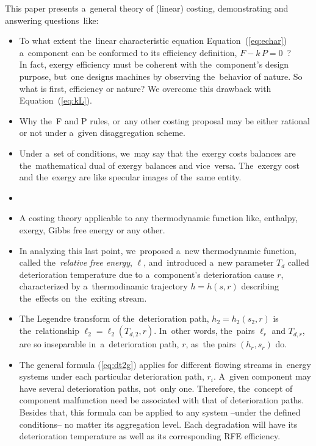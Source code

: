 \documentclass[energies,article,accept,moreauthors,pdftex]{Definitions/mdpi}
\begin{document}
This paper presents a~general theory of (linear) costing, demonstrating and answering questions~like:
\begin{itemize}[leftmargin=*,labelsep=5.5mm]
	\item To what extent the~linear characteristic equation Equation~(\ref{eq:echar}) a~component can be conformed to its efficiency definition, $F - k\, P = 0$~?\\
	In fact, exergy efficiency must be coherent with the~component's design purpose, but~one designs machines by observing the~behavior of nature. So what is first, efficiency or nature? We overcome this drawback with Equation~(\ref{eq:kL}).
	\item Why the~F and P rules, or~any other costing proposal may be either rational or not under a~given disaggregation scheme.
	\item Under a~set of conditions, we~may say that the~exergy costs balances are the~mathematical dual of exergy balances and vice~versa. The~exergy cost and the~exergy are like specular images of the~same entity.
	\item {}
	\item A costing theory applicable to any thermodynamic function like, enthalpy, exergy, Gibbs free energy or any other.
	\item In analyzing this last point, we~proposed a~new thermodynamic function, called the~\emph{relative free energy}, $\ell$, and~introduced a~new parameter $T_d$ called deterioration temperature due to a~component’s deterioration cause $r$, characterized by a~thermodinamic trajectory $h=h(s, r)$ describing the~effects on~the~exiting stream.
	\item The Legendre transform of the~deterioration path, $h_2=h_2 (s_2, r)$ is the~relationship
	$\ell_2 = \ell_2(T_{d,2} , r)$. In~other words, the~pairs  $\ell_r$ and $T_{d,r}$, are so inseparable in~a~deterioration path, $r$, as~the pairs $(h_r,s_r)$ do.
	\item The general formula (\ref{eq:dt2g}) applies for different flowing streams in~energy systems under each particular deterioration path, $r_i$. A~given component may have several deterioration paths, not~only one. Therefore, the~concept of component malfunction need be associated with that of deterioration paths. Besides that, this formula can be applied to any system --under the defined conditions--  no matter its aggregation level. Each degradation will have its deterioration temperature as well as its corresponding RFE efficiency.

\end{itemize}
\end{document}

